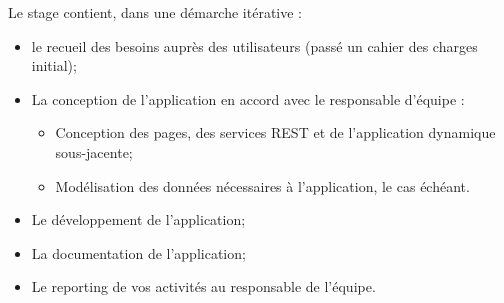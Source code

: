 Le stage contient, dans une démarche itérative :
\begin{itemize}
  \item le recueil des besoins auprès des utilisateurs (passé un cahier des charges initial);
  \item La conception de l’application en accord avec le responsable d’équipe :
  \begin{itemize}
    \item Conception des pages, des services REST et de l’application dynamique sous-jacente;
    \item Modélisation des données nécessaires à l’application, le cas échéant.
  \end{itemize}
  \item Le développement de l’application;
  \item La documentation de l’application;
  \item Le reporting de vos activités au responsable de l’équipe.
\end{itemize}

\clearpage
